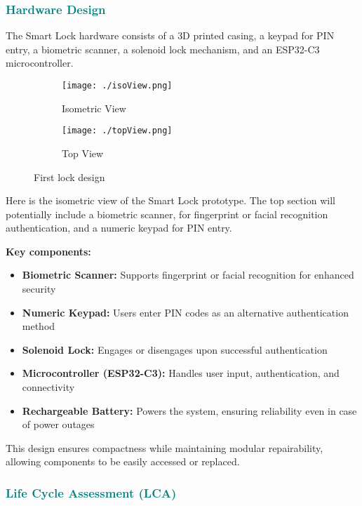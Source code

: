 \subsubsection{\textcolor{teal}{Hardware Design}}

The Smart Lock hardware consists of a 3D printed casing, a keypad for PIN entry, a biometric scanner, a solenoid lock mechanism, and an ESP32-C3 microcontroller.

\begin{figure}[htbp]
    \centering
    \begin{subfigure}[b]{0.48\textwidth}
        \texttt{[image: ./isoView.png]}
        \caption{Isometric View}
        \label{fig:isoView}
    \end{subfigure}
    \hfill
    \begin{subfigure}[b]{0.48\textwidth}
        \texttt{[image: ./topView.png]}
        \caption{Top View}
        \label{fig:topView}
    \end{subfigure}
    \caption{First lock design}
\end{figure}

Here is the isometric view of the Smart Lock prototype. The top section will potentially include a biometric scanner, for fingerprint or facial recognition authentication, and a numeric keypad for PIN entry.\newline

\textbf{Key components:}
\begin{itemize}
    \item \textbf{Biometric Scanner:} Supports fingerprint or facial recognition for enhanced security
    \item \textbf{Numeric Keypad:} Users enter PIN codes as an alternative authentication method
    \item \textbf{Solenoid Lock:} Engages or disengages upon successful authentication
    \item \textbf{Microcontroller (ESP32-C3):} Handles user input, authentication, and connectivity
    \item \textbf{Rechargeable Battery:} Powers the system, ensuring reliability even in case of power outages
\end{itemize}

This design ensures compactness while maintaining modular repairability, allowing components to be easily accessed or replaced.


\subsubsection{\textcolor{teal}{Life Cycle Assessment (LCA)}}

